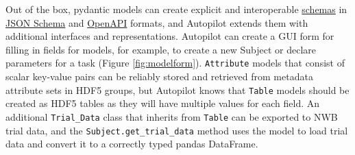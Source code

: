 Out of the box, pydantic models can create explicit and interoperable \href{https://pydantic-docs.helpmanual.io/usage/schema/}{schemas} in \href{https://json-schema.org/draft/2020-12/json-schema-core.html}{JSON Schema} and \href{https://github.com/OAI/OpenAPI-Specification}{OpenAPI} formats, and Autopilot extends them with additional interfaces and representations. Autopilot can create a GUI form for filling in fields for models, for example, to create a new Subject or declare parameters for a task (Figure \ref{fig:modelform}). \texttt{Attribute} models that consist of scalar key-value pairs can be reliably stored and retrieved from metadata attribute sets in HDF5 groups, but Autopilot knows that \texttt{Table} models should be created as HDF5 tables as they will have multiple values for each field. An additional \texttt{Trial\_Data} class that inherits from \texttt{Table} can be exported to NWB trial data, and the \texttt{Subject.get\_trial\_data} method uses the model to load trial data and convert it to a correctly typed pandas\citep{mckinneyPandasFoundationalPython2011} DataFrame.

